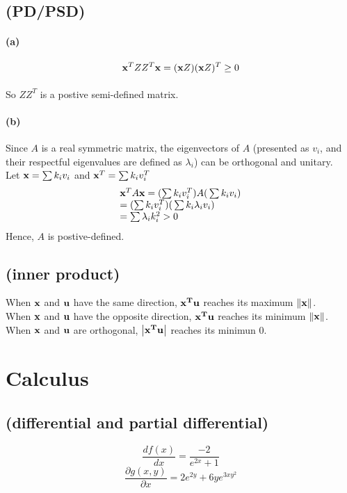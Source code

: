\documentclass[a4paper]{exam}
\begin{document}
\subsection{(PD/PSD)}
\paragraph{(a)}
	\[{{\bf{x}}^T}Z{Z^T}{\bf{x}} = ({\bf{x}}Z){({\bf{x}}Z)^T} \ge 0\]
\paragraph{}
So $Z{Z^T}$ is a postive semi-defined matrix.
\paragraph{(b)}
Since $A$ is a real symmetric matrix, the eigenvectors of $A$ (presented as ${v_i}$, and their respectful eigenvalues are defined as ${\lambda _i}$) can be orthogonal and unitary.\\
Let ${\bf{x}} = \sum {{k_i}{v_i}} $ and ${{\bf{x}}^T} = \sum {{k_i}v_i^T} $
\[\begin{array}{l}
{{\bf{x}}^T}A{\bf{x}} = (\sum {{k_i}v_i^T)A(} \sum {{k_i}{v_i}} )\\
= (\sum {{k_i}v_i^T)(} \sum {{k_i}{\lambda _i}{v_i}} )\\
= \sum {{\lambda _i}k_i^2}  > 0
\end{array}\]
\indent Hence, $A$ is postive-defined.
\subsection{(inner product)}
\noindent When $\bf{x}$ and $\bf{u}$ have the same direction, ${\bf{x}^T}\bf{u}$ reaches its maximum $\left\| \bf{x} \right\|$.\\
When $\bf{x}$ and $\bf{u}$ have the opposite direction, ${\bf{x}^T}\bf{u}$ reaches its minimum $\left\| \bf{x} \right\|$.\\
When $\bf{x}$ and $\bf{u}$ are orthogonal, $\left| {{{\bf{x}}^{\bf{T}}}{\bf{u}}} \right|$ reaches its minimun 0.\\
\section{Calculus}
\subsection{(differential and partial differential)}
\[\frac{{df(x)}}{{dx}} = \frac{{ - 2}}{{{e^{2x}} + 1}}\]
\[\frac{{\partial g(x,y)}}{{\partial x}} = 2{e^{2y}} + 6y{e^{3xy^2}}\]
\end{document}
